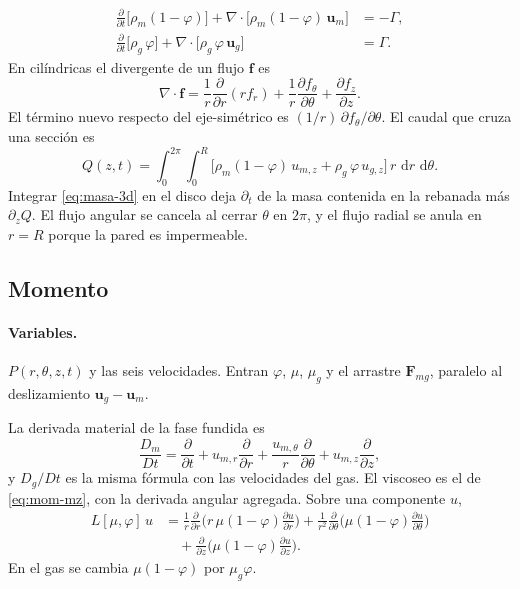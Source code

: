 \documentclass[11pt,a4paper]{article}
\newcommand{\dd}{\,\mathrm{d}}
\newcommand{\p}{\partial}
\begin{document}
\begin{align}
\label{eq:masa-3d}
\frac{\p}{\p t}\bigl[\rho_m(1-\varphi)\bigr]
+\nabla\cdot\bigl[\rho_m(1-\varphi)\,\mathbf{u}_m\bigr]
&=-\Gamma,
\\
\frac{\p}{\p t}\bigl[\rho_g\,\varphi\bigr]
+\nabla\cdot\bigl[\rho_g\,\varphi\,\mathbf{u}_g\bigr]
&=\Gamma.
\end{align}
En cilíndricas el divergente de un flujo $\mathbf{f}$ es
\begin{equation}
\label{eq:div-cil}
\nabla\cdot\mathbf{f}
=\frac{1}{r}\frac{\p}{\p r}(r f_r)
+\frac{1}{r}\frac{\p f_\theta}{\p\theta}
+\frac{\p f_z}{\p z}.
\end{equation}
El término nuevo respecto del eje-simétrico es
$(1/r)\,\p f_\theta/\p\theta$. El caudal que cruza una sección es
\begin{equation}
\label{eq:Q-3d}
Q(z,t)
=\int_0^{2\pi}\!\int_0^R
\bigl[
\rho_m(1-\varphi)\,u_{m,z}
+\rho_g\,\varphi\,u_{g,z}
\bigr]\,r\,\dd r\,\dd\theta.
\end{equation}
Integrar \eqref{eq:masa-3d} en el disco deja
$\p_t$ de la masa contenida en la rebanada más $\p_z Q$. El flujo
angular se cancela al cerrar $\theta$ en $2\pi$, y el flujo radial
se anula en $r=R$ porque la pared es impermeable.

\subsection{Momento}

\paragraph{Variables.}
$P(r,\theta,z,t)$ y las seis velocidades. Entran $\varphi$, $\mu$,
$\mu_g$ y el arrastre $\mathbf{F}_{mg}$, paralelo al
deslizamiento $\mathbf{u}_g-\mathbf{u}_m$.

La derivada material de la fase fundida es
\begin{equation}
\label{eq:Dt}
\frac{D_m}{Dt}
=\frac{\p}{\p t}
+u_{m,r}\frac{\p}{\p r}
+\frac{u_{m,\theta}}{r}\frac{\p}{\p\theta}
+u_{m,z}\frac{\p}{\p z},
\end{equation}
y $D_g/Dt$ es la misma fórmula con las velocidades del gas. El
viscoseo es el de \eqref{eq:mom-mz}, con la derivada angular
agregada. Sobre una componente $u$,
\begin{equation}
\label{eq:L3}
\begin{aligned}
L[\mu,\varphi]\,u
&=
\frac{1}{r}\frac{\p}{\p r}\Biggl(
r\,\mu(1-\varphi)\frac{\p u}{\p r}
\Biggr)
+\frac{1}{r^2}\frac{\p}{\p\theta}\Biggl(
\mu(1-\varphi)\frac{\p u}{\p\theta}
\Biggr)
\\
&\quad
+\frac{\p}{\p z}\Biggl(
\mu(1-\varphi)\frac{\p u}{\p z}
\Biggr).
\end{aligned}
\end{equation}
En el gas se cambia $\mu(1-\varphi)$ por $\mu_g\varphi$.
\end{document}
